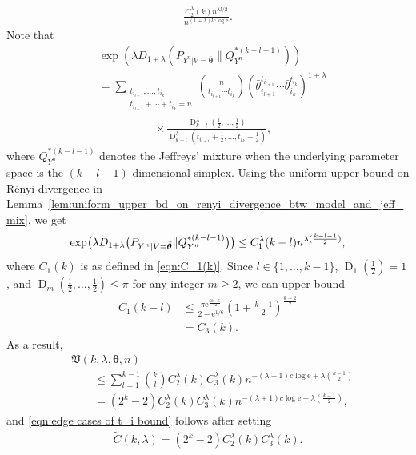 \documentclass[journal, 10pt]{IEEEtran}
\def\ds{\displaystyle}
\newcommand{\rme}{\mathrm{e}}
\newcommand{\mfrakV}{\mathfrak{V}}
\theoremstyle{plain}
\theoremstyle{plain}
\theoremstyle{plain}
\theoremstyle{plain}
\newcommand{\boldtheta}{\mathbold{\theta}}
\newcommand{\opD}{\operatorname{D}}
\begin{document}
\begin{appendices}
\begin{IEEEproof}
\begin{align}
 \frac{C_2^\lambda(k) n^{ \lambda l/2}}{n^{(1+\lambda)lc \log \rme}}.   \nonumber
\end{align} 
Note that
\begin{align}
&\exp\left(\lambda D_{1+\lambda}\left( P_{Y^n|V=\bar{\boldtheta}} \big\| Q_{Y^n}^{\ast{(k-l-1)}}\right)\right) \nonumber
  \\
&= \sum_{\substack{t_{i_{l+1}},\hdots, t_{i_k} \\ t_{i_{l+1}}+\cdots+t_{i_k}=n }}  \binom{n}{t_{i_{l+1}}\cdots t_{i_k}}\left(\bar{\theta}_{i_{l+1}}^{t_{i_{l+1}}} \cdots \bar{\theta}_{i_k}^{t_{i_k}} \right)^{1+\lambda}
\\  
&\qquad \qquad \quad  \times 
\frac{\opD^\lambda_{k-l}(\frac12, \hdots, \frac12)}{\opD^\lambda_{k-l}(t_{i_{l+1}}+\frac12, \hdots, t_{i_k}+\frac12)}
\text{,} \nonumber
\end{align}	
where $Q_{Y^n}^{\ast{(k-l-1)}}$ denotes the Jeffreys' mixture when the underlying parameter space is the $(k-l-1)$-dimensional simplex. Using the uniform upper bound on R\'enyi divergence in Lemma~\ref{lem:uniform_upper_bd_on_renyi_divergence_btw_model_and_jeff_mix}, we get
\begin{align}
\exp \hspace{-0.5mm}\big(\lambda D_{1+\lambda}\big( P_{Y^n|V=\bar{\boldtheta}} \| Q_{Y^n}^{\ast{(k-l-1)}}\big)\big)  \le C_1^\lambda(k-l) n^{\lambda(\frac{k-l-1}{2})}\text{,}
\end{align}	
where $C_1(k)$ is as defined in \eqref{eqn:C_1(k)}. Since $l\in \{1, \hdots, k-1 \} $, $\opD_1(\frac12)=1 $, and $\opD_m(\frac12, \hdots, \frac12)\le \pi $ for any integer $m\ge 2 $, we can upper bound
\begin{align}
C_1(k-l)&\le 
\frac{\ds  \pi\rme^{\frac{6k-5}{12}}}{
\ds 2-\rme^{1/6}  } \left(1+\frac{k-1}{2} \right)^{\frac{k-2}{2}} \label{eqn:bound_on_C_1(k-l)} \\
&=C_3(k)\text{.} \label{eqn:C_3}
\end{align}	
As a result,
\begin{align}
&\mfrakV(k, \lambda, \boldtheta, n) \nonumber \\
&\qquad \le 
\sum_{l=1}^{k-1}\binom{k}{l}C_2^\lambda(k) C_3^\lambda(k) n^{-(\lambda+1)c \log \rme+\lambda \left(\frac{k-1}{2} \right)}  \\
&\qquad =
(2^k-2)C_2^\lambda(k) C_3^\lambda(k) n^{-(\lambda+1)c \log \rme+\lambda \left(\frac{k-1}{2} \right)} \text{,}
\end{align}
and \eqref{eqn:edge cases of t_i bound} follows after setting
\begin{align}
\widetilde{C}(k,\lambda)=(2^k-2)C_2^\lambda(k) C_3^\lambda(k)\text{.} \label{eqn:C-tilde}
\end{align} 	
\end{IEEEproof}

\end{appendices}
\end{document}
